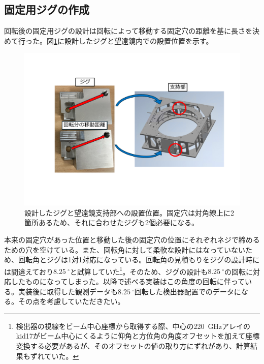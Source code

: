 \subsection{固定用ジグの作成}
回転後の固定用ジグの設計は回転によって移動する固定穴の距離を基に長さを決めて行った。図\ref{jig_fixing}に設計したジグと望遠鏡内での設置位置を示す。
\begin{figure}[htbp]
  \centering
  \includegraphics[width=0.85\columnwidth]{5_alignment/figs/jig_making.pdf}
  \caption{設計したジグと望遠鏡支持部への設置位置。固定穴は対角線上に2箇所あるため、それに合わせたジグも2個必要になる。}
  \label{jig_fixing}
\end{figure}
本来の固定穴があった位置と移動した後の固定穴の位置にそれぞれネジで締めるための穴を空けている。また、回転角に対して柔軟な設計にはなっていないため、回転角とジグは1対1対応になっている。回転角の見積もりをジグの設計時には間違えており$\SI{8.25}{^{\circ}}$と試算していた\footnote{検出器の視線をビーム中心座標から取得する際、中心の\SI{220}{GHz}アレイのkid17がビーム中心にくるように仰角と方位角の角度オフセットを加えて座標変換する必要があるが、そのオフセットの値の取り方にずれがあり、計算結果もずれていた。}。そのため、ジグの設計も$\SI{8.25}{^{\circ}}$の回転に対応したものになってしまった。以降で述べる実装はこの角度の回転に伴っている。実装後に取得した観測データも$\SI{8.25}{^{\circ}}$回転した検出器配置でのデータになる。その点を考慮していただきたい。

